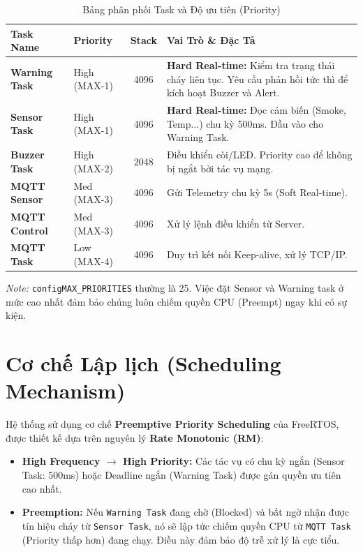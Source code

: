\documentclass[12pt,a4paper]{report}
\begin{document}
\begin{table}[h]
\centering
\begin{tabularx}{\textwidth}{|l|l|c|X|}
\hline
\textbf{Task Name} & \textbf{Priority} & \textbf{Stack} & \textbf{Vai Trò \& Đặc Tả} \\ \hline
\textbf{Warning Task} & High (MAX-1) & 4096 & \textbf{Hard Real-time:} Kiểm tra trạng thái cháy liên tục. Yêu cầu phản hồi tức thì để kích hoạt Buzzer và Alert. \\ \hline
\textbf{Sensor Task} & High (MAX-1) & 4096 & \textbf{Hard Real-time:} Đọc cảm biến (Smoke, Temp...) chu kỳ 500ms. Đầu vào cho Warning Task. \\ \hline
\textbf{Buzzer Task} & High (MAX-2) & 2048 & Điều khiển còi/LED. Priority cao để không bị ngắt bởi tác vụ mạng. \\ \hline
\textbf{MQTT Sensor} & Med (MAX-3) & 4096 & Gửi Telemetry chu kỳ 5s (Soft Real-time). \\ \hline
\textbf{MQTT Control} & Med (MAX-3) & 4096 & Xử lý lệnh điều khiển từ Server. \\ \hline
\textbf{MQTT Task} & Low (MAX-4) & 4096 & Duy trì kết nối Keep-alive, xử lý TCP/IP. \\ \hline
\end{tabularx}
\caption{Bảng phân phối Task và Độ ưu tiên (Priority)}
\end{table}

\textit{Note:} \texttt{configMAX\_PRIORITIES} thường là 25. Việc đặt Sensor và Warning task ở mức cao nhất đảm bảo chúng luôn chiếm quyền CPU (Preempt) ngay khi có sự kiện.

\section{Cơ chế Lập lịch (Scheduling Mechanism)}
Hệ thống sử dụng cơ chế \textbf{Preemptive Priority Scheduling} của FreeRTOS, được thiết kế dựa trên nguyên lý \textbf{Rate Monotonic (RM)}:
\begin{itemize}
    \item \textbf{High Frequency $\rightarrow$ High Priority:} Các tác vụ có chu kỳ ngắn (Sensor Task: 500ms) hoặc Deadline ngắn (Warning Task) được gán quyền ưu tiên cao nhất.
    \item \textbf{Preemption:} Nếu \texttt{Warning Task} đang chờ (Blocked) và bất ngờ nhận được tín hiệu cháy từ \texttt{Sensor Task}, nó sẽ lập tức chiếm quyền CPU từ \texttt{MQTT Task} (Priority thấp hơn) đang chạy. Điều này đảm bảo độ trễ xử lý là cực tiểu.
\end{itemize}
\end{document}

